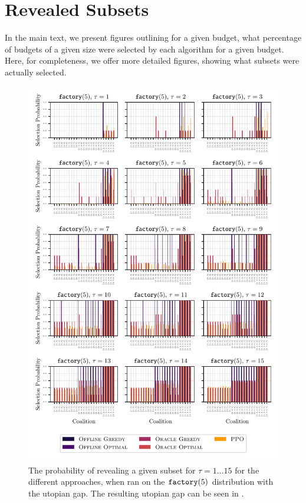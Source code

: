 \chapter{Revealed Subsets}
\label{app:subsets}

In the main text, we present figures outlining for a given budget, what percentage of budgets of a given size were selected by each algorithm for a given budget.
Here, for completeness, we offer more detailed figures, showing what subsets were actually selected.

\begin{figure}[t!]
  \centering
	\includegraphics[width=\textwidth]{figures/exploitability_predictible_factory5_coalition_bars.pdf}
	\caption{ The probability of revealing a given subset for $\tau=1\ldots 15$ for the different approaches, when ran on the $\factory[5]$ distribution with the utopian gap. 
		The resulting utopian gap can be seen in .
	}
\end{figure}

